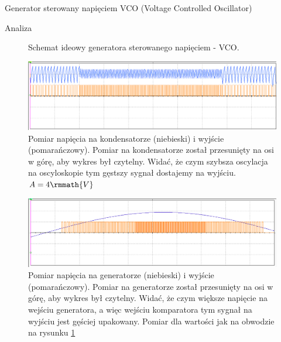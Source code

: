\documentclass[a4paper]{scrartcl}
\begin{document}
\begin{section}{Generator sterowany napięciem VCO (Voltage Controlled Oscillator)}
\begin{subsection}{Analiza}
\begin{figure}[ht]
\begin{subfigure}{0.25\linewidth}
\begin{center}
				\end{center}
				\end{subfigure}
				\caption{Schemat ideowy generatora sterowanego napięciem - VCO.}
				\label{fig:circuit-05}
				\end{figure}

				\begin{figure}[!ht]
				\begin{center}
					\includegraphics[width=\linewidth]{05-out}
					\caption{Pomiar napięcia na kondensatorze (niebieski) i wyjście (pomarańczowy). Pomiar na kondensatorze został przesunięty na osi w górę, aby wykres był czytelny. Widać, że czym szybsza oscylacja na oscyloskopie tym gęstszy sygnał dostajemy na wyjściu. $ A=4\rmmath{V} $}
				\end{center}
				\end{figure}

				\begin{figure}[!ht]
				\begin{center}
					\includegraphics[width=\linewidth]{05-gen-out}
					\caption{Pomiar napięcia na generatorze (niebieski) i wyjście (pomarańczowy). Pomiar na generatorze został przesunięty na osi w górę, aby wykres był czytelny. Widać, że czym większe napięcie na wejściu generatora, a więc wejściu komparatora tym sygnał na wyjściu jest gęściej upakowany. Pomiar dla wartości jak na obwodzie na rysunku \ref{fig:circuit-05}}
				\end{center}
				\end{figure}


\end{subsection}
\end{section}
\end{document}
